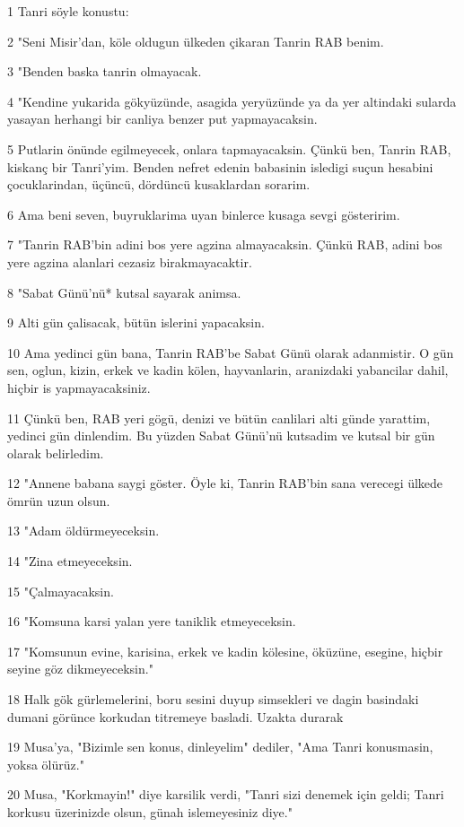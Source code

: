 \par 1 Tanri söyle konustu:
\par 2 "Seni Misir'dan, köle oldugun ülkeden çikaran Tanrin RAB benim.
\par 3 "Benden baska tanrin olmayacak.
\par 4 "Kendine yukarida gökyüzünde, asagida yeryüzünde ya da yer altindaki sularda yasayan herhangi bir canliya benzer put yapmayacaksin.
\par 5 Putlarin önünde egilmeyecek, onlara tapmayacaksin. Çünkü ben, Tanrin RAB, kiskanç bir Tanri'yim. Benden nefret edenin babasinin isledigi suçun hesabini çocuklarindan, üçüncü, dördüncü kusaklardan sorarim.
\par 6 Ama beni seven, buyruklarima uyan binlerce kusaga sevgi gösteririm.
\par 7 "Tanrin RAB'bin adini bos yere agzina almayacaksin. Çünkü RAB, adini bos yere agzina alanlari cezasiz birakmayacaktir.
\par 8 "Sabat Günü'nü* kutsal sayarak animsa.
\par 9 Alti gün çalisacak, bütün islerini yapacaksin.
\par 10 Ama yedinci gün bana, Tanrin RAB'be Sabat Günü olarak adanmistir. O gün sen, oglun, kizin, erkek ve kadin kölen, hayvanlarin, aranizdaki yabancilar dahil, hiçbir is yapmayacaksiniz.
\par 11 Çünkü ben, RAB yeri gögü, denizi ve bütün canlilari alti günde yarattim, yedinci gün dinlendim. Bu yüzden Sabat Günü'nü kutsadim ve kutsal bir gün olarak belirledim.
\par 12 "Annene babana saygi göster. Öyle ki, Tanrin RAB'bin sana verecegi ülkede ömrün uzun olsun.
\par 13 "Adam öldürmeyeceksin.
\par 14 "Zina etmeyeceksin.
\par 15 "Çalmayacaksin.
\par 16 "Komsuna karsi yalan yere taniklik etmeyeceksin.
\par 17 "Komsunun evine, karisina, erkek ve kadin kölesine, öküzüne, esegine, hiçbir seyine göz dikmeyeceksin."
\par 18 Halk gök gürlemelerini, boru sesini duyup simsekleri ve dagin basindaki dumani görünce korkudan titremeye basladi. Uzakta durarak
\par 19 Musa'ya, "Bizimle sen konus, dinleyelim" dediler, "Ama Tanri konusmasin, yoksa ölürüz."
\par 20 Musa, "Korkmayin!" diye karsilik verdi, "Tanri sizi denemek için geldi; Tanri korkusu üzerinizde olsun, günah islemeyesiniz diye."
